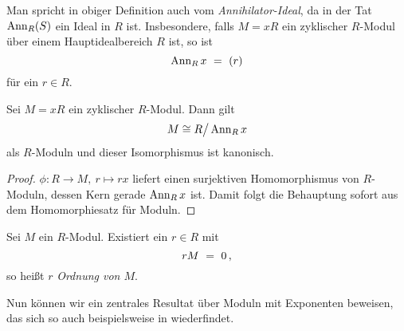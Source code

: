 \begin{bemerkung}
  Man spricht in obiger Definition auch vom \emph{Annihilator-Ideal}, da in der
  Tat $\operatorname{Ann}_R(S)$ ein Ideal in $R$ ist. Insbesondere, falls 
  $M = xR$ ein zyklischer $R$-Modul über einem Hauptidealbereich $R$ ist, so
  ist 
  \[ \operatorname{Ann}_R x \ =\  (r)\]
  für ein $r\in R$.
\end{bemerkung}


\begin{lemma}
  Sei $M = xR$ ein zyklischer $R$-Modul. Dann gilt
  \[M \cong R\big/\operatorname{Ann}_Rx\]
  als $R$-Moduln und dieser Isomorphismus ist kanonisch.
\end{lemma}
\begin{proof}
  $\phi:R \to M,\ r \mapsto rx$ liefert einen surjektiven Homomorphismus von
  $R$-Moduln, dessen Kern gerade $\operatorname{Ann}_Rx$ ist. Damit folgt die Behauptung
  sofort aus dem Homomorphiesatz für Moduln.
\end{proof}

\begin{definition}
  Sei $M$ ein $R$-Modul. Existiert ein $r \in R$ mit
  \[ rM \ =\  0\,,\]
  so heißt $r$ \emph{Ordnung von $M$}.
\end{definition}


Nun können wir ein zentrales Resultat über Moduln mit Exponenten beweisen, das
sich so auch beispielsweise in \autocite[Lemma 8.10]{hartley1974rings}
wiederfindet.

